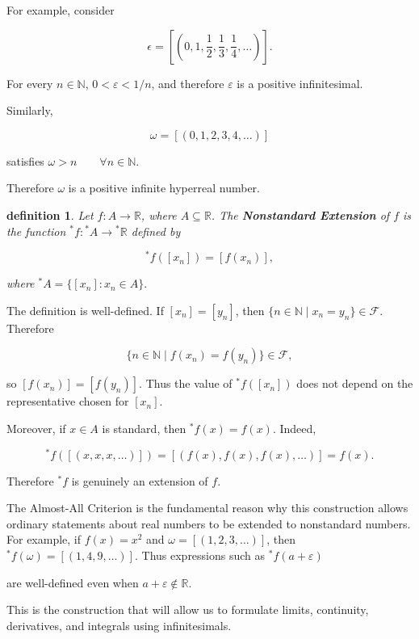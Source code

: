 \documentclass[10pt,a4paper]{book}
\newtheorem{definition}{definition}[section]
\begin{document}
For example, consider

$$
    \epsilon=
    \left[
        \left(
        0,1,\frac12,\frac13,\frac14,\ldots
        \right)
        \right].
$$

For every \(n\in\mathbb N\), \(0<\varepsilon<1/n\), and therefore
\(\varepsilon\) is a positive infinitesimal.

Similarly,

$$
    \omega=[(0,1,2,3,4,\ldots)]
$$

satisfies
$
    \omega>n
    \qquad\forall n\in\mathbb N.
$

Therefore \(\omega\) is a positive infinite hyperreal number.

\begin{definition}

    Let \(f:A\to\mathbb R\), where \(A\subseteq\mathbb R\). The \textbf{Nonstandard
        Extension} of \(f\) is the function
    $
        {}^\ast f:{}^\ast A\to{}^\ast\mathbb R
    $
    defined by

    $$
        {}^\ast f([x_n])=[f(x_n)],
    $$

    where
    $
        {}^\ast A=\{[x_n]:x_n\in A\}.
    $

\end{definition}

The definition is well-defined. If \([x_n]=[y_n]\), then
$
    \{n\in\mathbb N \mid x_n=y_n\}\in\mathcal F.
$
Therefore

$$
    \{n\in\mathbb N \mid f(x_n)=f(y_n)\}\in\mathcal F,
$$

so \([f(x_n)]=[f(y_n)]\). Thus the value of \({}^\ast f([x_n])\) does not
depend on the representative chosen for \([x_n]\).

Moreover, if \(x\in A\) is standard, then
$
    {}^\ast f(x)=f(x).
$
Indeed,

$$
    {}^\ast f([(x,x,x,\ldots)])
    =[(f(x),f(x),f(x),\ldots)]
    =f(x).
$$

Therefore \({}^\ast f\) is genuinely an extension of \(f\).

The Almost-All Criterion is the fundamental reason why this construction allows
ordinary statements about real numbers to be extended to nonstandard numbers.
For example, if \(f(x)=x^2\) and \(\omega=[(1,2,3,\ldots)]\), then
$
    {}^\ast f(\omega)=[(1,4,9,\ldots)].
$
Thus expressions such as
$
    {}^\ast f(a+\varepsilon)
$

are well-defined even when \(a+\varepsilon\notin\mathbb R\).

This is the construction that will allow us to formulate limits, continuity,
derivatives, and integrals using infinitesimals.
\end{document}
